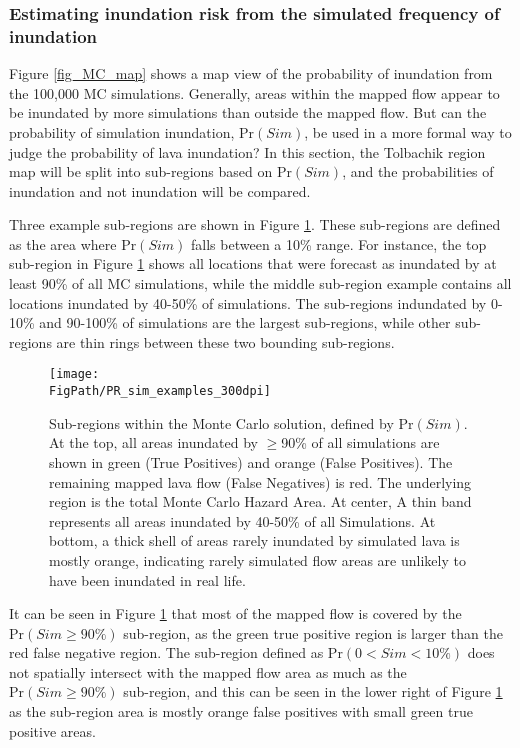 		\subsubsection{Estimating inundation risk from the simulated frequency of inundation}
		Figure \ref{fig_MC_map} shows a map view of the probability of inundation from the 100,000 MC simulations. Generally, areas within the mapped flow appear to be inundated by more simulations than outside the mapped flow. But can the probability of simulation inundation, $\text{Pr}(Sim)$, be used in a more formal way to judge the probability of lava inundation? In this section, the Tolbachik region map will be split into sub-regions based on $\text{Pr}(Sim)$, and the probabilities of inundation and not inundation will be compared.
		
		Three example sub-regions are shown in Figure \ref{fig_MCsubregions}. These sub-regions are defined as the area where $\text{Pr}(Sim)$ falls between a 10\% range. For instance, the top sub-region in Figure \ref{fig_MCsubregions} shows all locations that were forecast as inundated by at least 90\% of all MC simulations, while the middle sub-region example contains all locations inundated by 40-50\% of simulations. The sub-regions indundated by 0-10\% and 90-100\% of simulations are the largest sub-regions, while other sub-regions are thin rings between these two bounding sub-regions.
		
		\begin{figure}[!h]
			\centering
			\texttt{[image: \\FigPath/PR\_sim\_examples\_300dpi]}
			\caption[Sub-regions within the Monte Carlo solution, defined by $\text{Pr}(Sim)$]{Sub-regions within the Monte Carlo solution, defined by $\text{Pr}(Sim)$. At the top, all areas inundated by $\ge$90\% of all simulations are shown in green (True Positives) and orange (False Positives). The remaining mapped lava flow (False Negatives) is red. The underlying region is the total Monte Carlo Hazard Area. At center, A thin band represents all areas inundated by 40-50\% of all Simulations. At bottom, a thick shell of areas rarely inundated by simulated lava is mostly orange, indicating rarely simulated flow areas are unlikely to have been inundated in real life.}
			\label{fig_MCsubregions}
		\end{figure}	
		
		It can be seen in Figure \ref{fig_MCsubregions} that most of the mapped flow is covered by the $\text{Pr}(Sim\ge90\%)$ sub-region, as the green true positive region is larger than the red false negative region. The sub-region defined as $\text{Pr}(0<Sim<10\%)$ does not spatially intersect with the mapped flow area as much as the $\text{Pr}(Sim\ge90\%)$ sub-region, and this can be seen in the lower right of Figure \ref{fig_MCsubregions} as the sub-region area is mostly orange false positives with small green true positive areas.
		

